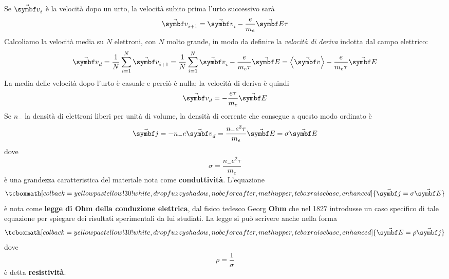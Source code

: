  Se $\vba{v}_i$ è la velocità dopo un urto, la velocità subito prima l'urto successivo sarà
\begin{equation*}
	\vba{v}_{i+1}=\vba{v}_i-\frac{e}{m_{e}}\vba{E}\tau
\end{equation*}
Calcoliamo la velocità media su $N$ elettroni, con $N$ molto grande, in modo da definire la \textit{velocità di deriva} indotta dal campo elettrico:
\begin{equation*}
	\vba{v}_d=\frac{1}{N}\sum_{i=1}^{N}\vba{v}_{i+1}=\frac{1}{N}\sum_{i=1}^{N}\vba{v}_i-\frac{e}{m_{e}\tau}\vba{E}=\left<\vba{v}\right>-\frac{e}{m_{e}\tau}\vba{E}
\end{equation*}
La media delle velocità dopo l'urto è casuale e perciò è nulla; la velocità di deriva è quindi
\begin{equation}
	\vba{v}_d=-\frac{e\tau}{m_{e}}\vba{E}
\end{equation}
Se $n_{-}$ la densità di elettroni liberi per unità di volume, la densità di corrente che consegue a questo modo ordinato è
\begin{equation}
	\vba{j}=-n_{-}e\vba{v}_d=\frac{n_{-}e^2\tau}{m_{e}}\vba{E}=\sigma\vba{E}
\end{equation}
dove
\begin{equation*}
	\sigma=\frac{n_{-}e^2\tau}{m_{e}}
\end{equation*}
è una grandezza caratteristica del materiale nota come \textbf{conduttività}.
L'equazione
\begin{equation}
	\tcboxmath[colback=yellowpastellow!30!white,drop fuzzy shadow, nobeforeafter, math upper, tcbox raise base, enhanced]{\vba{j}=\sigma\vba{E}}
\end{equation}
è nota come \textbf{legge di Ohm della conduzione elettrica}, dal fisico tedesco Georg \textbf{Ohm} che nel 1827 introdusse un caso specifico di tale equazione per spiegare dei risultati sperimentali da lui studiati. La legge si può scrivere anche nella forma
\begin{equation}
	\tcboxmath[colback=yellowpastellow!30!white,drop fuzzy shadow, nobeforeafter, math upper, tcbox raise base, enhanced]{\vba{E}=\rho\vba{j}}
\end{equation}
dove
\begin{equation*}
	\rho=\frac{1}{\sigma}
\end{equation*}
è detta \textbf{resistività}.
